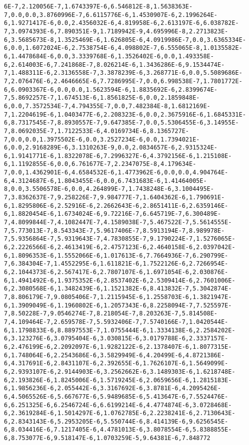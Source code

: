 \documentclass[11pt]{article}
\begin{document}
\begin{Verbatim}[commandchars=\\\{\}]
6E-7,2.120056E-7,1.6743397E-6,6.546812E-8,1.5638363E-7,0.0,0.0,3.8760996E-7,6.6115776E-6,1.4530907E-6,2.1996264E-6,1.9271417E-6,0.0,2.4356032E-6,4.819958E-6,2.613197E-6,6.038782E-7,3.0974393E-6,7.890351E-9,1.7189942E-9,4.695996E-8,2.2713823E-6,3.5685673E-8,1.3525469E-6,1.626805E-6,4.0919986E-7,0.0,3.6365334E-6,0.0,1.6072024E-6,2.7538754E-6,4.098802E-7,6.555065E-8,1.0135582E-6,1.4478684E-6,0.0,3.3339768E-6,1.3526402E-6,0.0,1.493358E-6,2.614003E-6,7.241868E-7,8.026214E-6,1.3436286E-6,9.1534474E-7,1.488311E-6,2.3136558E-7,3.3878239E-6,3.268771E-6,0.0,5.5089686E-7,2.076476E-6,2.4646665E-6,7.7286995E-7,0.0,6.998538E-7,1.7801772E-6,6.0903367E-6,0.0,0.0,1.5623594E-6,1.8835692E-6,2.8399674E-7,5.8692257E-7,1.674513E-6,1.8561825E-6,0.0,2.1859848E-6,0.0,7.3572534E-7,4.794355E-7,0.0,7.482384E-8,1.6812169E-7,1.2204619E-6,1.0403477E-6,2.208323E-6,0.0,2.3675916E-6,1.6845331E-6,8.7317545E-7,8.8930557E-7,9.647385E-7,0.0,5.5306455E-6,3.14955E-7,8.0692035E-7,1.7122533E-6,4.0169734E-6,8.1365727E-7,0.0,0.0,1.3975502E-6,0.0,3.2527234E-6,0.0,1.7394021E-6,0.0,2.9168289E-6,3.1310263E-9,0.0,2.0834657E-6,2.9315324E-6,1.9141771E-6,1.8322078E-6,7.2996327E-6,4.3792156E-6,1.215108E-6,1.1192855E-6,0.0,6.761677E-7,2.2347075E-8,4.179634E-7,0.0,1.4362901E-6,4.6584532E-6,1.4773962E-6,0.0,0.0,4.904764E-6,4.3124687E-6,1.8043455E-6,0.0,6.7431683E-6,1.41464005E-8,0.0,3.5506578E-6,0.0,4.264899E-7,1.7438248E-6,3.1004495E-7,3.8362637E-7,9.258226E-7,9.984777E-7,1.6404362E-6,1.790691E-6,1.8295806E-6,2.52916E-6,2.2662643E-6,2.8651411E-6,2.6359146E-6,1.8820454E-6,1.6734024E-6,9.72216E-7,6.645719E-7,6.300489E-7,4.8099844E-7,4.1082447E-7,4.1589038E-7,5.467522E-7,5.5614555E-7,5.773013E-7,8.543343E-7,5.9617406E-7,8.5913194E-7,8.989978E-7,5.9356864E-7,5.9319643E-7,4.7830855E-7,9.1790224E-7,1.5276065E-6,2.2226566E-6,2.4613419E-6,2.4757123E-6,2.4640158E-6,2.0397042E-6,1.8096353E-6,1.5552066E-6,1.017613E-6,7.7664936E-7,6.290799E-7,6.384304E-7,1.4552295E-6,1.611821E-6,1.7522126E-6,2.7266954E-6,2.1044373E-6,2.567417E-6,2.7807107E-6,1.6971054E-6,2.030876E-6,1.4941492E-6,1.9375352E-6,2.8537402E-6,2.5309414E-6,2.7601006E-6,2.3080568E-6,1.3482439E-6,1.1521382E-6,8.413832E-7,5.3042874E-7,8.806179E-7,9.0805406E-7,1.2115945E-6,1.2558703E-6,1.3821947E-6,1.3909049E-6,1.1960802E-6,1.2057343E-6,8.2258094E-7,7.525597E-7,8.50228E-7,9.0546274E-7,8.218054E-7,8.203263E-7,5.814508E-7,4.109464E-7,2.659578E-7,5.5932406E-7,7.5740166E-7,1.0420544E-6,1.1798833E-6,8.8897553E-7,1.0755444E-6,1.3334138E-6,2.2584202E-6,3.123276E-6,3.0795404E-6,3.030815E-6,3.0179788E-6,2.3337157E-6,2.476199E-6,2.2092097E-6,1.9282122E-6,2.1378407E-6,1.8077315E-6,1.748064E-6,2.2543686E-6,3.5829949E-6,4.20499E-6,4.8721386E-6,4.317691E-6,2.8431107E-6,2.392655E-6,1.7626107E-6,1.5649099E-6,2.9393107E-6,2.9144903E-6,3.2562662E-6,3.1489303E-6,1.6218748E-6,2.193826E-6,1.8245006E-6,1.5719245E-6,2.0659656E-6,1.2815183E-6,1.9856236E-6,2.055442E-6,3.3167692E-6,3.8781E-6,4.2095426E-6,4.5065526E-6,5.667677E-6,5.9489685E-6,5.413647E-6,7.5524476E-6,6.251325E-6,6.2546724E-6,6.6199214E-6,4.4774874E-6,3.0728468E-6,2.3619284E-6,1.5014297E-6,1.0762785E-6,2.2238241E-6,2.7130643E-6,2.8343143E-6,5.2953205E-6,5.550744E-6,8.414139E-6,9.6256545E-6,8.034416E-6,7.1217405E-6,4.4781013E-6,3.8078554E-6,5.8388855E-6,8.753077E-6,9.518147E-6,1.0703259E-5,9.64381E-6,7.848772
\end{Verbatim}
\end{document}
